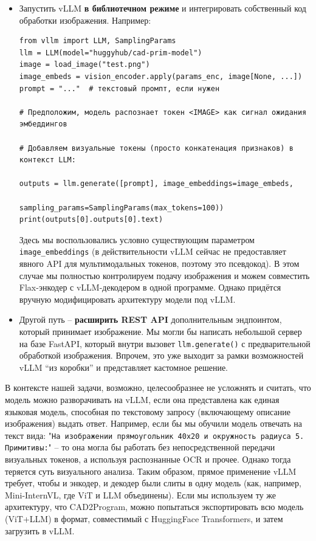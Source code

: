 \documentclass{article}
\begin{document}
\begin{itemize}
\item Запустить vLLM \textbf{в библиотечном режиме} и интегрировать собственный код обработки изображения. Например:
\begin{lstlisting}
from vllm import LLM, SamplingParams
llm = LLM(model="huggyhub/cad-prim-model")
image = load_image("test.png")
image_embeds = vision_encoder.apply(params_enc, image[None, ...])
prompt = "..."  # текстовый промпт, если нужен

# Предположим, модель распознает токен <IMAGE> как сигнал ожидания эмбеддингов

# Добавляем визуальные токены (просто конкатенация признаков) в контекст LLM:

outputs = llm.generate([prompt], image_embeddings=image_embeds, 
                      sampling_params=SamplingParams(max_tokens=100))
print(outputs[0].outputs[0].text)
\end{lstlisting}
Здесь мы воспользовались условно существующим параметром \texttt{image_embeddings} (в действительности vLLM сейчас не предоставляет явного API для мультимодальных токенов, поэтому это псевдокод). В этом случае мы полностью контролируем подачу изображения и можем совместить Flax-энкодер с vLLM-декодером в одной программе. Однако придётся вручную модифицировать архитектуру модели под vLLM.
\item Другой путь – \textbf{расширить REST API} дополнительным эндпоинтом, который принимает изображение. Мы могли бы написать небольшой сервер на базе FastAPI, который внутри вызовет \texttt{llm.generate()} с предварительной обработкой изображения. Впрочем, это уже выходит за рамки возможностей vLLM “из коробки” и представляет кастомное решение.
\end{itemize}

В контексте нашей задачи, возможно, целесообразнее не усложнять и считать, что модель можно разворачивать на vLLM, если она представлена как единая языковая модель, способная по текстовому запросу (включающему описание изображения) выдать ответ. Например, если бы мы обучили модель отвечать на текст вида: "\texttt{На изображении прямоугольник 40x20 и окружность радиуса 5. Примитивы:}" – то она могла бы работать без непосредственной передачи визуальных токенов, а используя распознанные OCR и прочее. Однако тогда теряется суть визуального анализа. Таким образом, прямое применение vLLM требует, чтобы и энкодер, и декодер были слиты в одну модель (как, например, Mini-InternVL, где ViT и LLM объединены). Если мы используем ту же архитектуру, что CAD2Program, можно попытаться экспортировать всю модель (ViT+LLM) в формат, совместимый с HuggingFace Transformers, и затем загрузить в vLLM.
\end{document}
